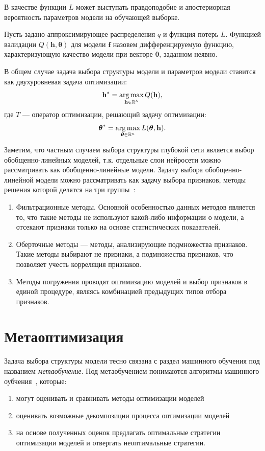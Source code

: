 В качестве функции $L$ может выступать правдоподобие и апостериорная вероятность параметров модели на обучающей выборке.

\begin{defin}
Пусть задано аппроксимирующее распределения $q$ и функция потерь $L$. 
Функцией валидации $Q(\mathbf{h},\boldsymbol{\theta})$ для модели $\mathbf{f}$ назовем дифференцируемую функцию, характеризующую качество модели при векторе $\boldsymbol{\theta}$, заданном неявно.
\end{defin}


В общем случае задача выбора структуры модели и параметров модели ставится как двухуровневая задача оптимизации:
\begin{equation}
\label{eq:optim}
	\mathbf{h}^{*} = \operatorname*{arg\,max}_{\mathbf{h} \in \mathbb{R}^h} Q(\mathbf{h}),
\end{equation}
где $T$ --- оператор оптимизации, решающий задачу оптимизации:
\[
   \boldsymbol{\theta}^{*} = \operatorname*{arg\,max}_{\boldsymbol{\theta} \in \mathbb{R}^u} L(\boldsymbol{\theta}, \mathbf{h}).
\]


Заметим, что частным случаем выбора структуры глубокой сети является выбор обобщенно-линейных моделей, т.к. отдельные слои нейросети можно рассматривать как обобщенно-линейные модели. Задачу выбора обобщенно-линейной модели можно рассматривать как задачу выбора признаков, методы решения которой делятся на три группы~\cite{feature_select}:
\begin{enumerate}
\item Фильтрационные методы. Основной особенностью данных методов является то, что такие методы не используют какой-либо информации о модели, а отсекают признаки только на основе статистических показателей. 
\item Оберточные методы --- методы, анализирующие подмножества признаков. Такие методы выбирают не признаки, а подмножества признаков, что позволяет учесть корреляция признаков.
\item Методы погружения проводят оптимизацию моделей и выбор признаков в единой процедуре, являясь комбинацией предыдущих типов отбора признаков.
\end{enumerate} 


\section{Метаоптимизация}
Задача выбора структуры модели тесно связана с раздел машинного обучения под названием \textit{метаобучение}. Под метаобучением понимаются алгоритмы машинного оубчения~\cite{metalearn}, которые:
\begin{enumerate}
\item могут оценивать и сравнивать методы оптимизации моделей
\item оценивать возможные декомпозиции процесса оптимизации моделей
\item на основе полученных оценок предлагать оптимальные стратегии оптимизации моделей и отвергать неоптимальные стратегии. 
\end{enumerate}



